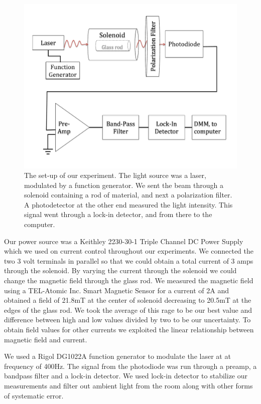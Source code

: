 \documentclass[prb,preprint]{revtex4-1}
\begin{document}
\begin{figure}[h!]
\centering
\includegraphics[width=6in]{Faraday_lab_set-up.pdf}
\caption{The set-up of our experiment. The light source was a laser, modulated by a function generator. We sent the beam through a solenoid containing a rod of material, and next a polarization filter. A photodetector at the other end measured the light intensity. This signal went through a  lock-in detector, and from there to the computer.}
\label{set-up}
\end{figure}


Our power source was a Keithley 2230-30-1 Triple Channel DC Power Supply which we used on current control throughout our experiments. We connected the two 3 volt terminals in parallel so that we could obtain a total current of 3 amps through the solenoid. By varying the current through the solenoid we could change the magnetic field through the glass rod. We measured the magnetic field using a TEL-Atomic Inc. Smart Magnetic Sensor for a current of 2A and obtained a field of 21.8mT at the center of solenoid decreasing to 20.5mT at the edges of the glass rod. We took the average of this rage to be our best value and difference between high and low values divided by two to be our uncertainty. To obtain field values for other currents we exploited the linear relationship between magnetic field and current.

We used a Rigol DG1022A function generator to modulate the laser at at frequency of 400Hz. The signal from the photodiode was run through a preamp, a bandpass filter and a lock-in detector. We used lock-in detector to stabilize our measurements and filter out ambient light from the room along with other forms of systematic error.
\end{document}
